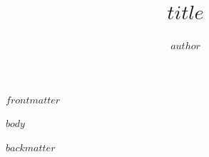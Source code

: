 \documentclass[11pt,twoside,openright]{book}
\title{$title$}
\author{$author$}
\begin{document}
\pagestyle{empty}



\setcounter{page}{1}

\tableofcontents
\cleardoublepage
\pagestyle{fancy}

$frontmatter$

\cleardoublepage
{}
\setcounter{page}{1}

$body$

\cleardoublepage
$backmatter$
\end{document}
